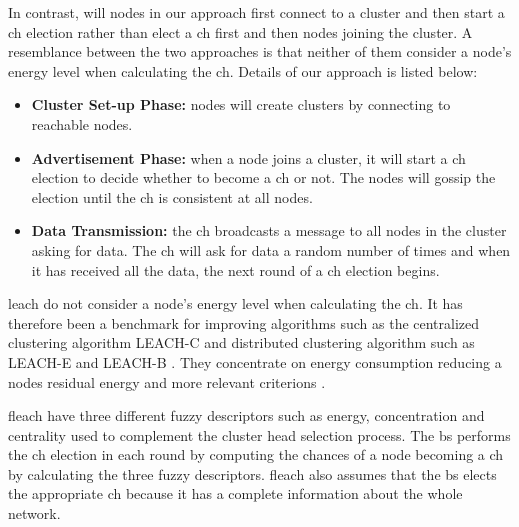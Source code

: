 \documentclass[USenglish]{uit-thesis}
\begin{document}
In contrast, will nodes in our approach first connect to a cluster and then start a \gls{ch} election rather than elect a \gls{ch} first and then nodes joining the cluster. %
A resemblance between the two approaches is that neither of them consider a node's energy level when calculating the \gls{ch}. Details of our approach is listed below:

\begin{itemize}
\item \textbf{Cluster Set-up Phase:} nodes will create clusters by connecting to reachable nodes.
\item \textbf{Advertisement Phase:} when a node joins a cluster, it will start a \gls{ch} election to decide whether to become a \gls{ch} or not. The nodes will gossip the election until the \gls{ch} is consistent at all nodes.
\item \textbf{Data Transmission:} the \gls{ch} broadcasts a message to all nodes in the cluster asking for data. The \gls{ch} will ask for data a random number of times and when it has received all the data, the next round of a \gls{ch} election begins.
\end{itemize}




\gls{leach} do not consider a node's energy level when calculating the \gls{ch}. It has therefore been a benchmark for improving algorithms such as the centralized clustering algorithm LEACH-C \cite {leach_c} and distributed clustering algorithm such as LEACH-E \cite{leach_e} and LEACH-B \cite{leach_b}. They concentrate on energy consumption reducing a nodes residual energy and more relevant criterions \cite{dec_cb_alg}.



\Gls{fleach} \cite{fuzzy_logic, ch_fuzzy} have three different fuzzy descriptors such as energy, concentration and centrality used to complement the cluster head selection process. The \gls{bs} performs the \gls{ch} election in each round by computing the chances of a node becoming a \gls{ch} by calculating the three fuzzy descriptors. \Gls{fleach} also assumes that the \gls{bs} elects the appropriate \gls{ch} because it has a complete information about the whole network.
\end{document}
